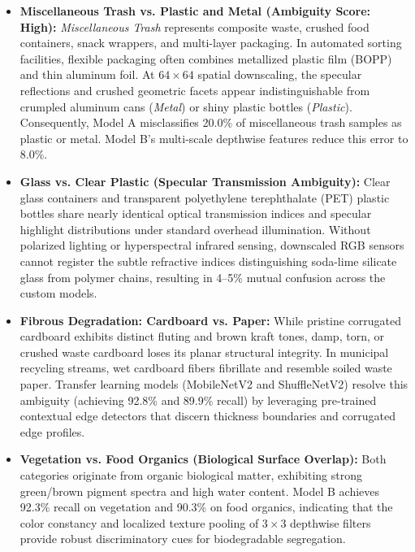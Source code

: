 \documentclass[11pt,a4paper]{article}
\begin{document}
\begin{itemize}[leftmargin=*,itemsep=3pt]
  \item \textbf{Miscellaneous Trash vs. Plastic and Metal (Ambiguity Score: High):}
  \textit{Miscellaneous Trash} represents composite waste, crushed food containers, snack wrappers, and multi-layer packaging. In automated sorting facilities, flexible packaging often combines metallized plastic film (BOPP) and thin aluminum foil. At $64 \times 64$ spatial downscaling, the specular reflections and crushed geometric facets appear indistinguishable from crumpled aluminum cans (\textit{Metal}) or shiny plastic bottles (\textit{Plastic}). Consequently, Model A misclassifies 20.0\% of miscellaneous trash samples as plastic or metal. Model B's multi-scale depthwise features reduce this error to 8.0\%.

  \item \textbf{Glass vs. Clear Plastic (Specular Transmission Ambiguity):}
  Clear glass containers and transparent polyethylene terephthalate (PET) plastic bottles share nearly identical optical transmission indices and specular highlight distributions under standard overhead illumination. Without polarized lighting or hyperspectral infrared sensing, downscaled RGB sensors cannot register the subtle refractive indices distinguishing soda-lime silicate glass from polymer chains, resulting in 4--5\% mutual confusion across the custom models.

  \item \textbf{Fibrous Degradation: Cardboard vs. Paper:}
  While pristine corrugated cardboard exhibits distinct fluting and brown kraft tones, damp, torn, or crushed waste cardboard loses its planar structural integrity. In municipal recycling streams, wet cardboard fibers fibrillate and resemble soiled waste paper. Transfer learning models (MobileNetV2 and ShuffleNetV2) resolve this ambiguity (achieving 92.8\% and 89.9\% recall) by leveraging pre-trained contextual edge detectors that discern thickness boundaries and corrugated edge profiles.

  \item \textbf{Vegetation vs. Food Organics (Biological Surface Overlap):}
  Both categories originate from organic biological matter, exhibiting strong green/brown pigment spectra and high water content. Model B achieves 92.3\% recall on vegetation and 90.3\% on food organics, indicating that the color constancy and localized texture pooling of $3 \times 3$ depthwise filters provide robust discriminatory cues for biodegradable segregation.
\end{itemize}
\end{document}
